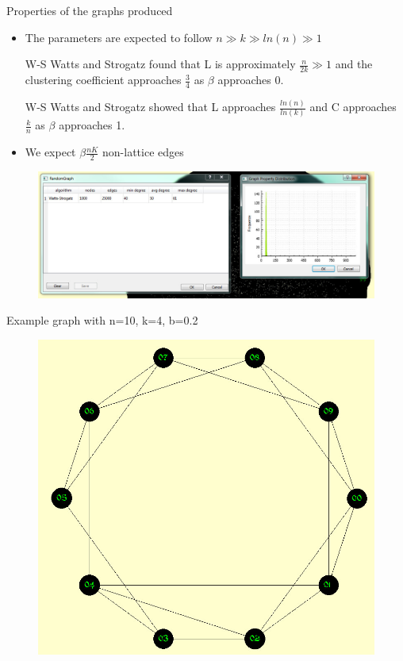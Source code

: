 \documentclass{beamer}
\begin{document}
\begin{frame}{Properties of the graphs produced}
\begin{itemize}
\item The parameters are expected to follow $ n \gg k \gg ln(n) \gg 1$
\item [W-S]Watts and Strogatz found that L is approximately $\frac{n}{2k} \gg 1$ and the clustering coefficient approaches  $\frac{3}{4}$ as $\beta$ approaches 0.
\item [W-S] Watts and Strogatz showed that L approaches $\frac{ln(n)}{ln(k)}$ and C approaches $\frac{k}{n}$ as $\beta$ approaches 1.
\item We expect $\beta\frac{nK}{2}$ non-lattice edges
\end{itemize}
\begin{figure}
\includegraphics[width= .55\paperwidth]{WSbig.jpg}
\end{figure}
\end{frame}

\begin{frame}{Example graph with n=10, k=4, b=0.2}
\begin{figure}
\includegraphics[width= .55\paperwidth]{WSpic.jpg}
\end{figure}
\end{frame}
\end{document}

